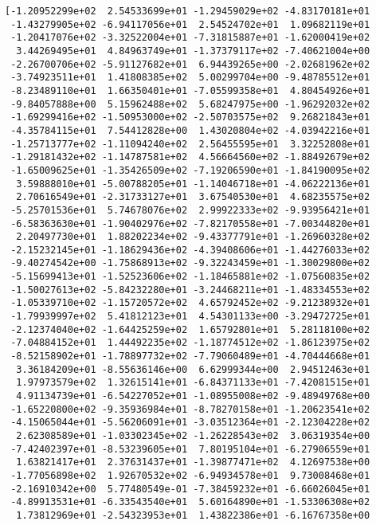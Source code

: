\documentclass[11pt]{article}
\begin{document}
    \begin{Verbatim}[commandchars=\\\{\}]
[-1.20952299e+02  2.54533699e+01 -1.29459029e+02 -4.83170181e+01
 -1.43279905e+02 -6.94117056e+01  2.54524702e+01  1.09682119e+01
 -1.20417076e+02 -3.32522004e+01 -7.31815887e+01 -1.62000419e+02
  3.44269495e+01  4.84963749e+01 -1.37379117e+02 -7.40621004e+00
 -2.26700706e+02 -5.91127682e+01  6.94439265e+00 -2.02681962e+02
 -3.74923511e+01  1.41808385e+02  5.00299704e+00 -9.48785512e+01
 -8.23489110e+01  1.66350401e+01 -7.05599358e+01  4.80454926e+01
 -9.84057888e+00  5.15962488e+02  5.68247975e+00 -1.96292032e+02
 -1.69299416e+02 -1.50953000e+02 -2.50703575e+02  9.26821843e+01
 -4.35784115e+01  7.54412828e+00  1.43020804e+02 -4.03942216e+01
 -1.25713777e+02 -1.11094240e+02  2.56455595e+01  3.32252808e+01
 -1.29181432e+02 -1.14787581e+02  4.56664560e+02 -1.88492679e+02
 -1.65009625e+01 -1.35426509e+02 -7.19206590e+01 -1.84190095e+02
  3.59888010e+01 -5.00788205e+01 -1.14046718e+01 -4.06222136e+01
  2.70616549e+01 -2.31733127e+01  3.67540530e+01  4.68235575e+02
 -5.25701536e+01  5.74678076e+02  2.99922333e+02 -9.93956421e+01
 -6.58363630e+01 -1.90402976e+02 -7.82170558e+01 -7.00344820e+01
  2.20497730e+01  1.88202234e+02 -9.43377791e+01 -1.26960328e+02
 -2.15232145e+01 -1.18629436e+02 -4.39408606e+01 -1.44276033e+02
 -9.40274542e+00 -1.75868913e+02 -9.32243459e+01 -1.30029800e+02
 -5.15699413e+01 -1.52523606e+02 -1.18465881e+02 -1.07560835e+02
 -1.50027613e+02 -5.84232280e+01 -3.24468211e+01 -1.48334553e+02
 -1.05339710e+02 -1.15720572e+02  4.65792452e+02 -9.21238932e+01
 -1.79939997e+02  5.41812123e+01  4.54301133e+00 -3.29472725e+01
 -2.12374040e+02 -1.64425259e+02  1.65792801e+01  5.28118100e+02
 -7.04884152e+01  1.44492235e+02 -1.18774512e+02 -1.86123975e+02
 -8.52158902e+01 -1.78897732e+02 -7.79060489e+01 -4.70444668e+01
  3.36184209e+01 -8.55636146e+00  6.62999344e+00  2.94512463e+01
  1.97973579e+02  1.32615141e+01 -6.84371133e+01 -7.42081515e+01
  4.91134739e+01 -6.54227052e+01 -1.08955008e+02 -9.48949768e+00
 -1.65220800e+02 -9.35936984e+01 -8.78270158e+01 -1.20623541e+02
 -4.15065044e+01 -5.56206091e+01 -3.03512364e+01 -2.12304228e+02
  2.62308589e+01 -1.03302345e+02 -1.26228543e+02  3.06319354e+00
 -7.42402397e+01 -8.53239605e+01  7.80195104e+01 -6.27906559e+01
  1.63821417e+01  2.37631437e+01 -1.39877471e+02  4.12697538e+00
 -1.77056898e+02  1.92670532e+02 -6.94934578e+01  9.73008468e+01
 -2.16910342e+00  5.77480549e-01 -7.38459232e+01 -6.66026045e+01
 -4.89913531e+01 -6.33543540e+01  5.60164890e+01 -1.53306308e+02
  1.73812969e+01 -2.54323953e+01  1.43822386e+01 -6.16767358e+00

\end{Verbatim}
\end{document}
